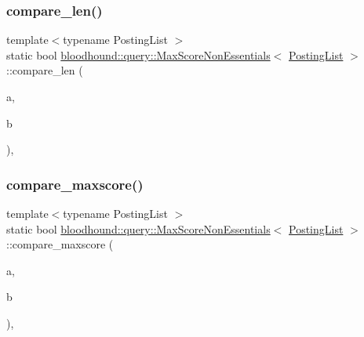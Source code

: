 \subsubsection{\texorpdfstring{compare\+\_\+len()}{compare\_len()}}
{\footnotesize\ttfamily template$<$typename Posting\+List $>$ \\
static bool \hyperlink{classbloodhound_1_1query_1_1MaxScoreNonEssentials}{bloodhound\+::query\+::\+Max\+Score\+Non\+Essentials}$<$ \hyperlink{classbloodhound_1_1PostingList}{Posting\+List} $>$\+::compare\+\_\+len (\begin{DoxyParamCaption}\item[{const \hyperlink{classbloodhound_1_1PostingList}{Posting\+List} \&}]{a,  }\item[{const \hyperlink{classbloodhound_1_1PostingList}{Posting\+List} \&}]{b }\end{DoxyParamCaption})\hspace{0.3cm}{\ttfamily [inline]}, {\ttfamily [static]}}

\mbox{\label{classbloodhound_1_1query_1_1MaxScoreNonEssentials_a758b1b31a3ec9b563978ed7a11e3987c}} 
\subsubsection{\texorpdfstring{compare\+\_\+maxscore()}{compare\_maxscore()}}
{\footnotesize\ttfamily template$<$typename Posting\+List $>$ \\
static bool \hyperlink{classbloodhound_1_1query_1_1MaxScoreNonEssentials}{bloodhound\+::query\+::\+Max\+Score\+Non\+Essentials}$<$ \hyperlink{classbloodhound_1_1PostingList}{Posting\+List} $>$\+::compare\+\_\+maxscore (\begin{DoxyParamCaption}\item[{const \hyperlink{classbloodhound_1_1PostingList}{Posting\+List} \&}]{a,  }\item[{const \hyperlink{classbloodhound_1_1PostingList}{Posting\+List} \&}]{b }\end{DoxyParamCaption})\hspace{0.3cm}{\ttfamily [inline]}, {\ttfamily [static]}}

